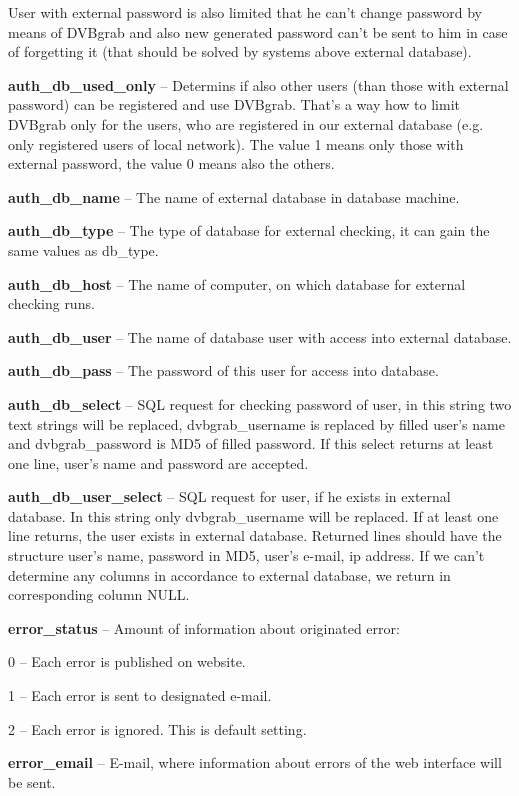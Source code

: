 User with external password is also limited that he can't change password by means of DVBgrab and also new generated password can't be sent to him in case of forgetting it (that should be solved by systems above external database).
\item\textbf{auth\_db\_used\_only} -- Determins if also other users (than those with external password) can be registered and use DVBgrab. That's a way how to limit DVBgrab only for the users, who are registered in our external database (e.g. only registered users of local network). The value 1 means only those with external password, the value 0 means also the others.
\item\textbf{auth\_db\_name} -- The name of external database in database machine.
\item\textbf{auth\_db\_type} -- The type of database for external checking, it can gain the same values as db\_type.
\item\textbf{auth\_db\_host} -- The name of computer, on which database for external checking runs.
\item\textbf{auth\_db\_user} -- The name of database user with access into external database.
\item\textbf{auth\_db\_pass} -- The password of this user for access into database.
\item\textbf{auth\_db\_select} -- SQL request for checking password of user, in this string two text strings will be replaced, dvbgrab\_username is replaced by filled user's name and dvbgrab\_password is MD5 of filled password. If this select returns at least one line, user's name and password are accepted.
\item\textbf{auth\_db\_user\_select} -- SQL request for user, if he exists in external database. In this string only dvbgrab\_username will be replaced. If at least one line returns, the user exists in external database. Returned lines should have the structure user's name, password in MD5, user's e-mail, ip address. If we can't determine any columns in accordance to external database, we return in corresponding column NULL.
\item\textbf{error\_status} -- Amount of information about originated error:
\bitem
\item 0 -- Each error is published on website.
\item 1 -- Each error is sent to designated e-mail.
\item 2 -- Each error is ignored. This is default setting.
\eitem
\item\textbf{error\_email} -- E-mail, where information about errors of the web interface will be sent.
